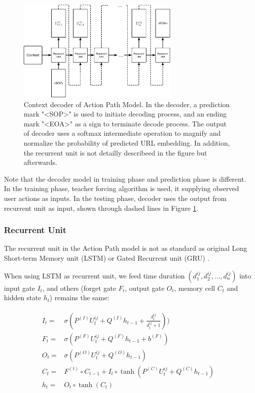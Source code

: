 \begin{figure}[H]
    \centering
    \includegraphics[width=0.7\textwidth]{figures/decoder}
    \caption{Context decoder of Action Path Model. In the decoder, 
    a prediction mark "<SOP>" is used to initiate decoding process, 
    and an ending mark "<EOA>" as a sign to terminate decode process.
    The output of decoder uses a softmax intermediate operation to magnify and normalize
    the probability of predicted URL embedding.
    In addition, the recurrent unit is not detailly describeed in the figure but afterwards.}
    \label{fig:decoder}
\end{figure}

Note that the decoder model in training phase and prediction phase is different.
In the training phase, teacher forcing algorithm \cite{williams1989learning} is used, 
it supplying observed user actions as inputs.
In the testing phase, decoder uses the output from recurrent unit as input, shown through 
dashed lines in Figure \ref{fig:decoder}.


\subsubsection{Recurrent Unit}
\label{sec:recurrent-unit}

The recurrent unit in the Action Path model is not as standard as original Long Short-term Memory unit (LSTM)
\cite{hochreiter1997lstm} or Gated Recurrent unit (GRU) \cite{DBLP:journals/corr/ChoMGBSB14}.

When using LSTM as recurrent unit, we feed time duration $(d^{ij}_1, d^{ij}_2, ..., d^{ij}_n)$
into input gate $I_t$, and others (forget gate $F_t$, output gate $O_t$, memory cell $C_t$ and hidden state $h_t$) 
remains the same:

\begin{align}
\label{eqn:lstm}
\begin{split}
    I_t =& \sigma ( P^{(I)} U^{ij}_t + Q^{(I)} h_{t-1} + \frac{d^{ij}_t}{d^{ij}_t + 1}) ) \\
    F_t =& \sigma ( P^{(F)} U^{ij}_t + Q^{(F)} h_{t-1} + b^{(F)}) \\
    O_t =& \sigma ( P^{(O)} U^{ij}_t + Q^{(O)} h_{t-1} ) \\
    C_t =& F^{(t)} \circ C_{t-1} + I_t \circ \tanh (P^{(C)} U^{ij}_t + Q^{(C)} h_{t-1}) \\
    h_t =& O_t \circ \tanh (C_t)
\end{split}
\end{align}

